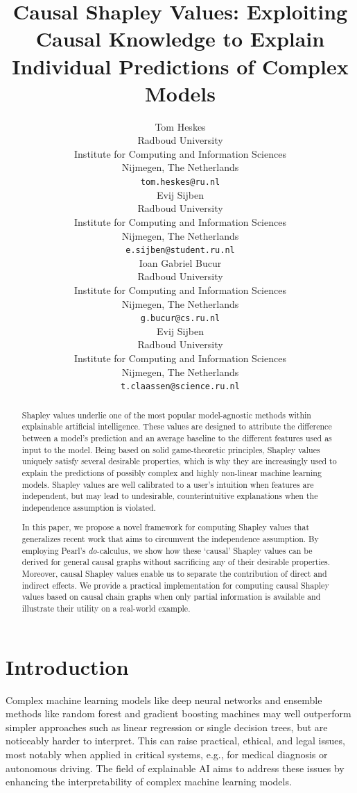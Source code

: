 \documentclass{article}
\title{Causal Shapley Values: Exploiting Causal Knowledge to Explain Individual Predictions of Complex Models}
\author{%
  Tom Heskes\\
  Radboud University \\
  Institute for Computing and Information Sciences\\
  Nijmegen, The Netherlands \\
  \texttt{tom.heskes@ru.nl} \\
  \And
  Evij Sijben\\
  Radboud University \\
  Institute for Computing and Information Sciences\\
  Nijmegen, The Netherlands \\
  \texttt{e.sijben@student.ru.nl} \\
  \AND
  Ioan Gabriel Bucur \\
  Radboud University \\
  Institute for Computing and Information Sciences\\
  Nijmegen, The Netherlands \\
  \texttt{g.bucur@cs.ru.nl} \\
  \And
  Evij Sijben\\
  Radboud University \\
  Institute for Computing and Information Sciences\\
  Nijmegen, The Netherlands \\
  \texttt{t.claassen@science.ru.nl} \\
}
\begin{document}
\maketitle

\begin{abstract}
Shapley values underlie one of the most popular model-agnostic methods within explainable artificial intelligence. These values are designed to attribute the difference between a model's prediction and an average baseline to the different features used as input to the model. Being based on solid game-theoretic principles, Shapley values uniquely satisfy several desirable properties, which is why they are increasingly used to explain the predictions of possibly complex and highly non-linear machine learning models. Shapley values are well calibrated to a user’s intuition when features are independent, but may lead to undesirable, counterintuitive explanations when the independence assumption is violated.

In this paper, we propose a novel framework for computing Shapley values that generalizes recent work that aims to circumvent the independence assumption. By employing Pearl's \textit{do}-calculus, we show how these `causal' Shapley values can be derived for general causal graphs without sacrificing any of their desirable properties. Moreover, causal Shapley values enable us to separate the contribution of direct and indirect effects. We provide a practical implementation for computing causal Shapley values based on causal chain graphs when only partial information is available and illustrate their utility on a real-world example.
\end{abstract}


\section{Introduction}

Complex machine learning models like deep neural networks and ensemble methods like random forest and gradient boosting machines may well outperform simpler approaches such as linear regression or single decision trees, but are noticeably harder to interpret. This can raise practical, ethical, and legal issues, most notably when applied in critical systems, e.g., for medical diagnosis or autonomous driving. The field of explainable AI aims to address these issues by enhancing the interpretability of complex machine learning models.
\end{document}
